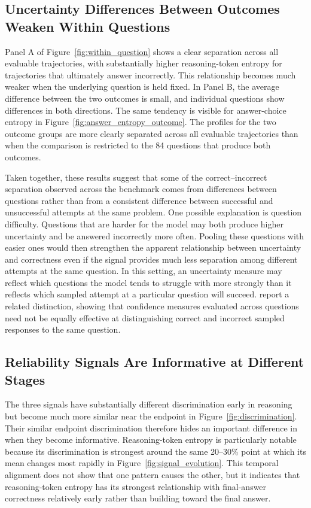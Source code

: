 \documentclass{article}
\begin{document}
\subsection{Uncertainty Differences Between Outcomes Weaken Within Questions}

Panel A of Figure~\ref{fig:within_question} shows a clear separation across all evaluable trajectories, with substantially higher reasoning-token entropy for trajectories that ultimately answer incorrectly. This relationship becomes much weaker when the underlying question is held fixed. In Panel B, the average difference between the two outcomes is small, and individual questions show differences in both directions. The same tendency is visible for answer-choice entropy in Figure~\ref{fig:answer_entropy_outcome}. The profiles for the two outcome groups are more clearly separated across all evaluable trajectories than when the comparison is restricted to the 84 questions that produce both outcomes.

Taken together, these results suggest that some of the correct--incorrect separation observed across the benchmark comes from differences between questions rather than from a consistent difference between successful and unsuccessful attempts at the same problem. One possible explanation is question difficulty. Questions that are harder for the model may both produce higher uncertainty and be answered incorrectly more often. Pooling these questions with easier ones would then strengthen the apparent relationship between uncertainty and correctness even if the signal provides much less separation among different attempts at the same question. In this setting, an uncertainty measure may reflect which questions the model tends to struggle with more strongly than it reflects which sampled attempt at a particular question will succeed. \citet{taubenfeld2025confidence} report a related distinction, showing that confidence measures evaluated across questions need not be equally effective at distinguishing correct and incorrect sampled responses to the same question.

\subsection{Reliability Signals Are Informative at Different Stages}

The three signals have substantially different discrimination early in reasoning but become much more similar near the endpoint in Figure~\ref{fig:discrimination}. Their similar endpoint discrimination therefore hides an important difference in when they become informative. Reasoning-token entropy is particularly notable because its discrimination is strongest around the same 20--30\% point at which its mean changes most rapidly in Figure~\ref{fig:signal_evolution}. This temporal alignment does not show that one pattern causes the other, but it indicates that reasoning-token entropy has its strongest relationship with final-answer correctness relatively early rather than building toward the final answer.
\end{document}
